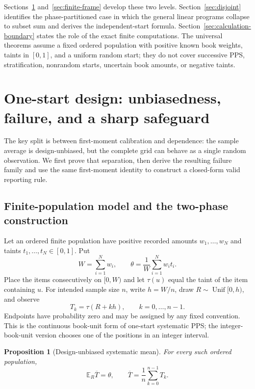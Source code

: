 \documentclass[11pt]{article}
\newtheorem{proposition}[theorem]{Proposition}
\theoremstyle{definition}
\newcommand{\E}{\mathbb{E}}
\begin{document}
Sections~\ref{sec:one-start} and~\ref{sec:finite-frame} develop these two
levels.  Section~\ref{sec:disjoint} identifies the phase-partitioned case in
which the general linear programs collapse to subset sum and derives the
independent-start formula.  Section~\ref{sec:calculation-boundary} states the
role of the exact finite computations.  The universal theorems assume a
fixed ordered population with positive known book weights, taints in
$[0,1]$, and a uniform random start; they do not cover successive PPS,
stratification, nonrandom starts, uncertain book amounts, or negative
taints.

\section{One-start design: unbiasedness, failure, and a sharp safeguard}
\label{sec:one-start}

The key split is between first-moment calibration and dependence: the sample
average is design-unbiased, but the complete grid can behave as a single
random observation. We first prove that separation, then derive the resulting
failure family and use the same first-moment identity to construct a
closed-form valid reporting rule.

\subsection{Finite-population model and the two-phase construction}

Let an ordered finite population have positive recorded amounts
$w_1,\ldots,w_N$ and taints $t_1,\ldots,t_N\in[0,1]$. Put
\[
 W=\sum_{i=1}^Nw_i,
 \qquad
 \theta=\frac1W\sum_{i=1}^Nw_it_i.
\]
Place the items consecutively on $[0,W)$ and let $\tau(u)$ equal the taint
of the item containing $u$. For intended sample size $n$, write $h=W/n$,
draw $R\sim\operatorname{Unif}[0,h)$, and observe
\[
 T_k=\tau(R+kh),\qquad k=0,\ldots,n-1.
\]
Endpoints have probability zero and may be assigned by any fixed convention.
This is the continuous book-unit form of one-start systematic PPS; the
integer-book-unit version chooses one of the positions in an integer interval.

\begin{proposition}[Design-unbiased systematic mean]
\label{prop:sysunbiased}
For every such ordered population,
\[
 \E_R\overline T=\theta,
 \qquad
 \overline T=\frac1n\sum_{k=0}^{n-1}T_k.
\]
\end{proposition}
\end{document}
